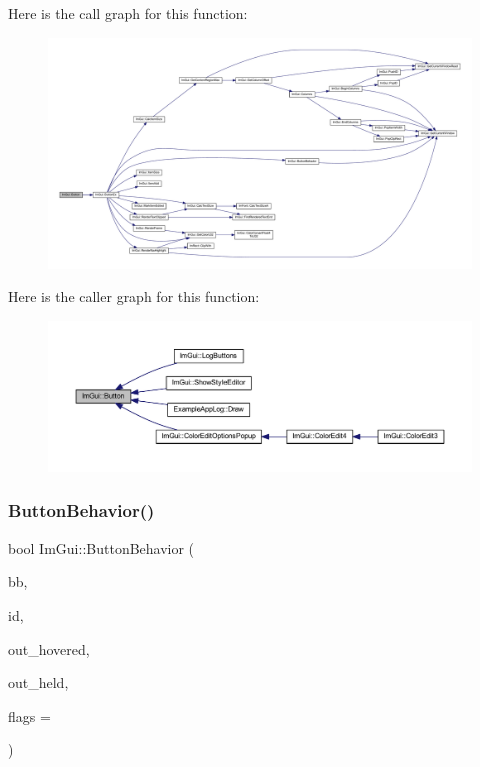 Here is the call graph for this function\+:
\nopagebreak
\begin{figure}[H]
\begin{center}
\leavevmode
\includegraphics[width=350pt]{namespace_im_gui_a38094c568ce398db5a3abb9d3ac92030_cgraph}
\end{center}
\end{figure}
Here is the caller graph for this function\+:
\nopagebreak
\begin{figure}[H]
\begin{center}
\leavevmode
\includegraphics[width=350pt]{namespace_im_gui_a38094c568ce398db5a3abb9d3ac92030_icgraph}
\end{center}
\end{figure}
\mbox{\label{namespace_im_gui_a65a4f18b1bc8ce0f351687922089f374}} 
\subsubsection{\texorpdfstring{Button\+Behavior()}{ButtonBehavior()}}
{\footnotesize\ttfamily bool Im\+Gui\+::\+Button\+Behavior (\begin{DoxyParamCaption}\item[{const \mbox{\hyperlink{struct_im_rect}{Im\+Rect}} \&}]{bb,  }\item[{\mbox{\hyperlink{imgui_8h_a1785c9b6f4e16406764a85f32582236f}{Im\+Gui\+ID}}}]{id,  }\item[{bool $\ast$}]{out\+\_\+hovered,  }\item[{bool $\ast$}]{out\+\_\+held,  }\item[{\mbox{\hyperlink{imgui__internal_8h_a990fae518aa1d95f571ee40989de4c22}{Im\+Gui\+Button\+Flags}}}]{flags = {} }\end{DoxyParamCaption})}

